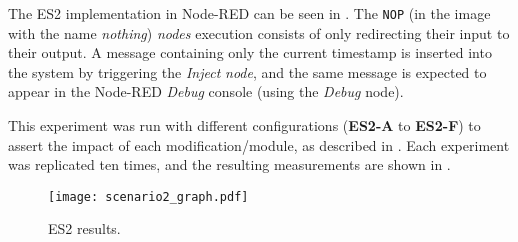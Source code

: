 The ES2 implementation in Node-RED can be seen in . The \texttt{NOP} (in the image with the name \textit{nothing}) \textit{nodes} execution consists of only redirecting their input to their output. A message containing only the current timestamp is inserted into the system by triggering the \textit{Inject} \textit{node}, and the same message is expected to appear in the Node-RED \textit{Debug} console (using the \textit{Debug} node).

\captionsetup{belowskip=12pt,aboveskip=4pt}
\begin{table}[ht]
    \centering
    \caption{Scenario 2 results}
    \label{tab:scenario2_table}
\end{table}{}

This experiment was run with different configurations (\textbf{ES2-A} to \textbf{ES2-F}) to assert the impact of each modification/module, as described in . Each experiment was replicated ten times, and the resulting measurements are shown in .

\begin{figure}[h]
\centering
\texttt{[image: scenario2\_graph.pdf]}
\caption[ES2 results.]{ES2 results.}\label{fig:scenario2_candlestick}
\end{figure}

